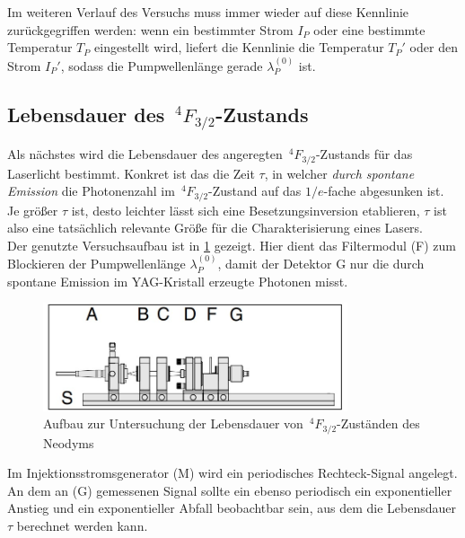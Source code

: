 \documentclass[../main.tex]{subfiles}
\begin{document}
        \begin{tcolorbox}
            Im weiteren Verlauf des Versuchs muss immer wieder auf diese Kennlinie zurückgegriffen werden: wenn ein bestimmter Strom $I_P$ oder eine bestimmte Temperatur $T_P$ eingestellt wird, liefert die Kennlinie die Temperatur $T_P'$ oder den Strom $I_P'$, sodass die Pumpwellenlänge gerade $\lambda_P^{(0)}$ ist.
        \end{tcolorbox}

    \subsection{Lebensdauer des $\,^4F_{3/2}$-Zustands}
        Als nächstes wird die Lebensdauer des angeregten $\,^4F_{3/2}$-Zustands für das Laserlicht bestimmt. Konkret ist das die Zeit $\tau$, in welcher \textit{durch spontane Emission} die Photonenzahl im $\,^4F_{3/2}$-Zustand auf das $1/e$-fache abgesunken ist. Je größer $\tau$ ist, desto leichter lässt sich eine Besetzungsinversion etablieren, $\tau$ ist also eine tatsächlich relevante Größe für die Charakterisierung eines Lasers.\\

        Der genutzte Versuchsaufbau ist in \ref{fig:Aufbau:Teil2} gezeigt. Hier dient das Filtermodul (F) zum Blockieren der Pumpwellenlänge $\lambda_P^{(0)}$, damit der Detektor G nur die durch spontane Emission im YAG-Kristall erzeugte Photonen misst.

        \begin{figure}[H]
            \centering
            \includegraphics[width=0.8\textwidth]{Bilddateien/Versuchsaufbau/Teil2.jpg}
            \caption{Aufbau zur Untersuchung der Lebensdauer von $\,^4F_{3/2}$-Zuständen des Neodyms \cite[p.30]{doc:experiment08}}
            \label{fig:Aufbau:Teil2}
        \end{figure}    

        Im Injektionsstromsgenerator (M) wird ein periodisches Rechteck-Signal angelegt. An dem an (G) gemessenen Signal sollte ein ebenso periodisch ein exponentieller Anstieg und ein exponentieller Abfall beobachtbar sein, aus dem die Lebensdauer $\tau$ berechnet werden kann.  
\end{document}
